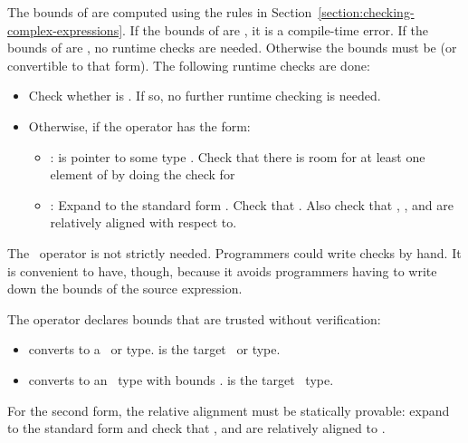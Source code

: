 The bounds of  are computed
using the rules in Section~\ref{section:checking-complex-expressions}.
If the bounds of  are \boundsunknown, it is a compile-time error. 
If the bounds of  are \boundsany, no runtime checks are needed.
Otherwise the bounds must be  (or convertible to that form).
The following runtime checks are done:
\begin{itemize}
\item Check whether  is .  If so, no further runtime checking
is needed.
\item Otherwise, if the operator has the form:
\begin{itemize}
\item
  :  is pointer to some type .
  Check that there is room for at least one element of  by doing
  the check for 
\item
  :
   Expand  to the standard
   form .
   Check that   \code{<=}  \code{&&}  \code{<=} .
   Also check that , , and  are relatively aligned 
   with respect to.
\end{itemize}
\end{itemize}
The \dynamicboundscast\ operator is not strictly needed.
Programmers could write checks by hand. It is convenient to have, though,
because it avoids programmers having to write down the bounds of the source expression.

The operator  declares bounds that are trusted
without verification:
\begin{itemize}
\item
  converts  to a \ptr\ or \code{*} type.  is the target \ptr\ or \code{*} type.
\item
  converts  to an \arrayptr\ type with bounds .   is the
  target \arrayptr\ type.
\end{itemize}
For the second form, the relative alignment must be statically
provable: expand  to the standard form
 and check
that ,  and  are relatively aligned to .

